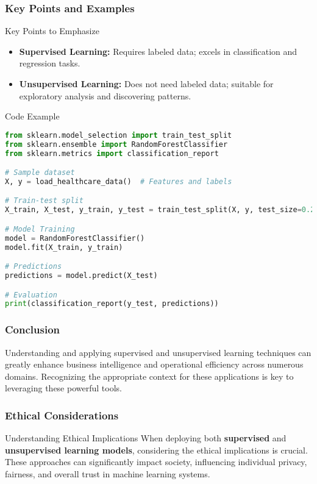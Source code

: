 \documentclass[aspectratio=169]{beamer}
\begin{document}
\begin{frame}[fragile]
    \frametitle{Key Points and Examples}
    \begin{block}{Key Points to Emphasize}
        \begin{itemize}
            \item \textbf{Supervised Learning:} Requires labeled data; excels in classification and regression tasks.
            \item \textbf{Unsupervised Learning:} Does not need labeled data; suitable for exploratory analysis and discovering patterns.
        \end{itemize}
    \end{block}

    \begin{block}{Code Example}
        \begin{lstlisting}[language=Python]
from sklearn.model_selection import train_test_split
from sklearn.ensemble import RandomForestClassifier
from sklearn.metrics import classification_report

# Sample dataset
X, y = load_healthcare_data()  # Features and labels

# Train-test split
X_train, X_test, y_train, y_test = train_test_split(X, y, test_size=0.2)

# Model Training
model = RandomForestClassifier()
model.fit(X_train, y_train)

# Predictions
predictions = model.predict(X_test)

# Evaluation
print(classification_report(y_test, predictions))
        \end{lstlisting}
    \end{block}
\end{frame}

\begin{frame}[fragile]
    \frametitle{Conclusion}
    Understanding and applying supervised and unsupervised learning techniques can greatly enhance business intelligence and operational efficiency across numerous domains. Recognizing the appropriate context for these applications is key to leveraging these powerful tools.
\end{frame}

\begin{frame}[fragile]
    \frametitle{Ethical Considerations}
    \begin{block}{Understanding Ethical Implications}
        When deploying both \textbf{supervised} and \textbf{unsupervised learning models}, considering the ethical implications is crucial. These approaches can significantly impact society, influencing individual privacy, fairness, and overall trust in machine learning systems.
    \end{block}
\end{frame}
\end{document}
